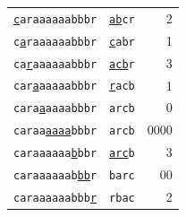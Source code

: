 
\vspace{1em}

\setlength{\tabcolsep}{18pt} %
\begin{tabular}{@{} l l r @{}}
\texttt{\underline{c}araaaaaabbbr} & \texttt{\underline{ab}cr} & 2 \\
\texttt{c\underline{a}raaaaaabbbr} & \texttt{\underline{c}abr} & 1 \\
\texttt{ca\underline{r}aaaaaabbbr} & \texttt{\underline{acb}r} & 3 \\
\texttt{car\underline{a}aaaaabbbr} & \texttt{\underline{r}acb} & 1 \\
\texttt{cara\underline{a}aaaabbbr} & \texttt{arcb} & 0 \\
\texttt{caraa\underline{aaaa}bbbr} & \texttt{arcb} & 0000 \\
\texttt{caraaaaaa\underline{b}bbr} & \texttt{\underline{arc}b} & 3 \\
\texttt{caraaaaaab\underline{bb}r} & \texttt{barc} & 00 \\
\texttt{caraaaaaabbb\underline{r}} & \texttt{rbac} & 2 \\
\end{tabular}

\vspace{1em}